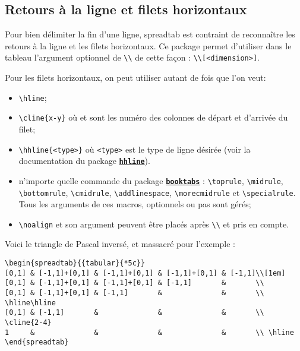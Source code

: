 \documentclass[a4paper,10pt]{article}
\newcommand\verbinline[1][]{\lstinline[breaklines=false,basicstyle=\normalsize\ttfamily,#1]}
\newcommand\ST{\textsf{spreadtab}\xspace}
\newcommand\falseverb[1]{\texttt{\detokenize{#1}}}
\begin{document}
\subsection{Retours à la ligne et filets horizontaux}
Pour bien délimiter la fin d'une ligne, \ST est contraint de reconnaître les retours à la ligne et les filets horizontaux. Ce package permet d'utiliser dans le tableau l'argument optionnel de \verb-\\- de cette façon : \verb-\\[<dimension>]-.

Pour les filets horizontaux, on peut utiliser autant de fois que l'on veut:
\begin{itemize}
	\item \verb-\hline-;
	\item \verb=\cline{x-y}= où \falseverb x et \falseverb y sont les numéro des colonnes de départ et d'arrivée du filet;
	\item \verb=\hhline{<type>}= où \verb=<type>= est le type de ligne désirée (voir la documentation du package \href{http://www.ctan.org/tex-archive/macros/latex/required/tools/}{\texttt{\textbf{hhline}}}).
	\item n'importe quelle commande du package \href{http://www.ctan.org/tex-archive/macros/latex/contrib/booktabs/}{\texttt{\textbf{booktabs}}} : \verb-\toprule-, \verb-\midrule-, \verb-\bottomrule-, \verb-\cmidrule-, \verb-\addlinespace-, \verb-\morecmidrule- et \verb-\specialrule-. Tous les arguments de ces macros, optionnels ou pas sont gérés;
	\item \verbinline-\noalign- et son argument peuvent être placés après \verb-\\- et pris en compte.
\end{itemize}
Voici le triangle de Pascal inversé, et massacré pour l'exemple :\par\nobreak
\begin{lstlisting}
\begin{spreadtab}{{tabular}{*5c}}
[0,1] & [-1,1]+[0,1] & [-1,1]+[0,1] & [-1,1]+[0,1] & [-1,1]\\[1em]
[0,1] & [-1,1]+[0,1] & [-1,1]+[0,1] & [-1,1]       &       \\
[0,1] & [-1,1]+[0,1] & [-1,1]       &              &       \\ \hline\hline
[0,1] & [-1,1]       &              &              &       \\ \cline{2-4}
1     &              &              &              &       \\ \hline
\end{spreadtab}
\end{lstlisting}
\end{document}
